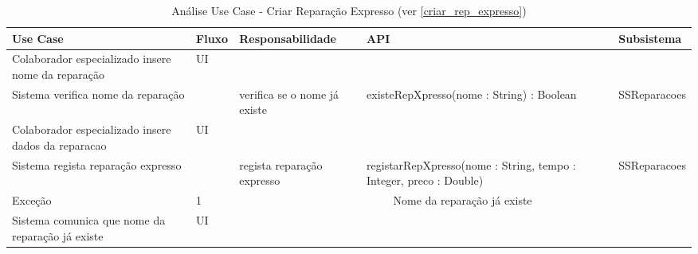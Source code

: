 \documentclass[../relatorio.tex]{subfiles}
\begin{document}
\begin{landscape}
    \begin{table}[!h]
        \centering
        \begin{tabular}{|p{5cm}|p{1cm}|p{4cm}|p{6cm}|p{3cm}|}
            \hline
            \rowcolor{gray!20!white}
            Use Case & Fluxo                                            & Responsabilidade & API & Subsistema \\
            \hline
            \rowcolor{yellow}
            Colaborador especializado insere nome da reparação
                     & UI
                     & 
                     & 
                     & 
            \\
            \hline
            Sistema verifica nome da reparação
                     & 
                     & verifica se o nome já existe
                     & existeRepXpresso(nome : String) : Boolean
                     & SSReparacoes
            \\
            \hline
            \rowcolor{yellow}
            Colaborador especializado insere dados da reparacao
                     & UI
                     & 
                     & 
                     & 
            \\
            \hline
            Sistema regista reparação expresso
                     & 
                     & regista reparação expresso
                     & registarRepXpresso(nome : String, tempo : Integer, preco : Double)
                     & SSReparacoes
            \\
            \hline
            \rowcolor{red!30}
            Exceção  & 1                                                 &  \multicolumn{3}{c}{Nome da reparação já existe}\\
            \hline
            Sistema comunica que nome da reparação já existe
                     & UI
                     & 
                     & 
                     & 
            \\
            \hline
        \end{tabular}
        \caption{Análise Use Case - Criar Reparação Expresso (ver \ref{criar_rep_expresso})}
    \end{table}
\end{landscape}
\end{document}
